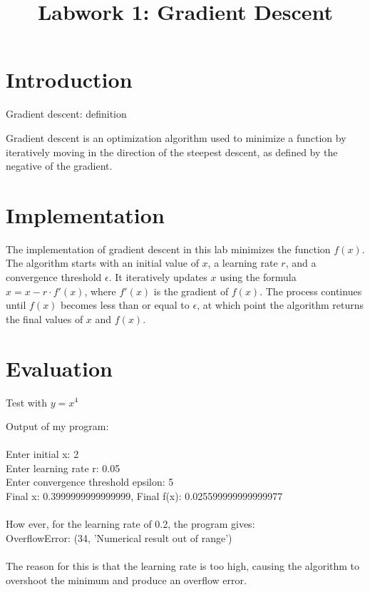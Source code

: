 \documentclass{article}
\title{Labwork 1: Gradient Descent}
\begin{document}
\maketitle

\setlength\parindent{0pt}

\section{Introduction}

Gradient descent: definition

Gradient descent is an optimization algorithm used to minimize a function by iteratively moving in the direction of the steepest descent, as defined by the negative of the gradient.

\section{Implementation}

The implementation of gradient descent in this lab minimizes the function $f(x)$. 
The algorithm starts with an initial value of $x$, a learning rate $r$, and a convergence threshold $\epsilon$. 
It iteratively updates $x$ using the formula $x = x - r \cdot f'(x)$, where $f'(x)$ is the gradient of $f(x)$. 
The process continues until $f(x)$ becomes less than or equal to $\epsilon$, at which point the algorithm returns the final values of $x$ and $f(x)$.

\section{Evaluation}

Test with $y = x^4$

Output of my program:\\
\\
Enter initial x: 2\\
Enter learning rate r: 0.05\\
Enter convergence threshold epsilon: 5\\
Final x: 0.3999999999999999, Final f(x): 0.025599999999999977\\
\\
How ever, for the learning rate of 0.2, the program gives:\\
OverflowError: (34, 'Numerical result out of range')\\
\\
The reason for this is that the learning rate is too high, causing the algorithm to overshoot the minimum and produce an overflow error.
\end{document}
